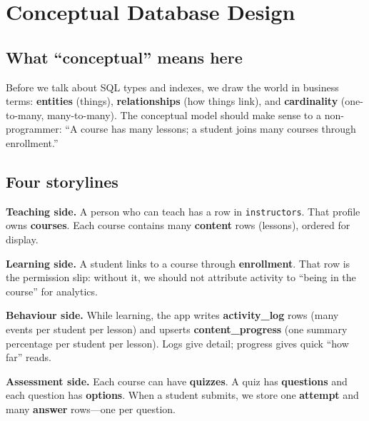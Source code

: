 
\chapter{Conceptual Database Design}
\label{ch:conceptual}

\section{What ``conceptual'' means here}
Before we talk about SQL types and indexes, we draw the world in business terms: \textbf{entities} (things), \textbf{relationships} (how things link), and \textbf{cardinality} (one-to-many, many-to-many). The conceptual model should make sense to a non-programmer: ``A course has many lessons; a student joins many courses through enrollment.''

\section{Four storylines}
\textbf{Teaching side.} A person who can teach has a row in \texttt{instructors}. That profile owns \textbf{courses}. Each course contains many \textbf{content} rows (lessons), ordered for display.

\textbf{Learning side.} A student links to a course through \textbf{enrollment}. That row is the permission slip: without it, we should not attribute activity to ``being in the course'' for analytics.

\textbf{Behaviour side.} While learning, the app writes \textbf{activity\_log} rows (many events per student per lesson) and upserts \textbf{content\_progress} (one summary percentage per student per lesson). Logs give detail; progress gives quick ``how far'' reads.

\textbf{Assessment side.} Each course can have \textbf{quizzes}. A quiz has \textbf{questions} and each question has \textbf{options}. When a student submits, we store one \textbf{attempt} and many \textbf{answer} rows---one per question.

